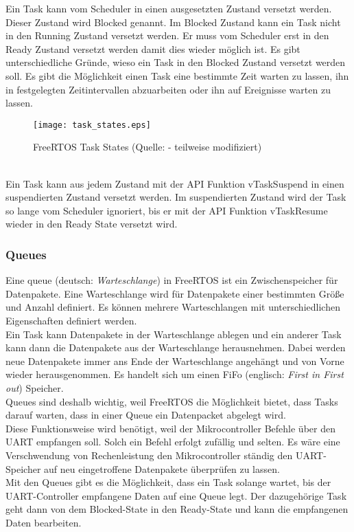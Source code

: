 \noindent
Ein Task kann vom Scheduler in einen ausgesetzten Zustand versetzt werden. Dieser Zustand wird Blocked genannt. Im Blocked Zustand kann ein Task nicht in den Running Zustand versetzt werden. Er muss vom Scheduler erst in den Ready Zustand versetzt werden damit dies wieder möglich ist. Es gibt unterschiedliche Gründe, wieso ein Task in den Blocked Zustand versetzt werden soll. Es gibt die Möglichkeit einen Task eine bestimmte Zeit warten zu lassen, ihn in festgelegten Zeitintervallen abzuarbeiten oder ihn auf Ereignisse warten zu lassen.
\cite[][S. 61]{FRTOSManual}
\begin{figure}[h]
\centering
\texttt{[image: task\_states.eps]}
\caption{FreeRTOS Task States (Quelle: \cite[][S. 67]{FRTOSManual} - teilweise modifiziert)}
\end{figure}
\\
\noindent
Ein Task kann aus jedem Zustand mit der API Funktion vTaskSuspend in einen suspendierten Zustand versetzt werden. Im suspendierten Zustand wird der Task so lange vom Scheduler ignoriert, bis er mit der API Funktion vTaskResume wieder in den Ready State versetzt wird.
\cite[][S. 46]{FRTOSManual}

\subsubsection{Queues}
Eine queue (deutsch: \textit{Warteschlange}) in FreeRTOS ist ein Zwischenspeicher für Datenpakete. Eine Warteschlange wird für Datenpakete einer bestimmten Größe und Anzahl definiert. Es können mehrere Warteschlangen mit unterschiedlichen Eigenschaften definiert werden.\\
Ein Task kann Datenpakete in der Warteschlange ablegen und ein anderer Task kann dann die Datenpakete aus der Warteschlange herausnehmen. Dabei werden neue Datenpakete immer ans Ende der Warteschlange angehängt und von Vorne wieder herausgenommen. Es handelt sich um einen FiFo (englisch: \textit{First in First out}) Speicher.\\
Queues sind deshalb wichtig, weil FreeRTOS die Möglichkeit bietet, dass Tasks darauf warten, dass in einer Queue ein Datenpacket abgelegt wird.\\
Diese Funktionsweise wird benötigt, weil der Mikrocontroller Befehle über den UART empfangen soll. Solch ein Befehl erfolgt zufällig und selten. Es wäre eine Verschwendung von Rechenleistung den Mikrocontroller ständig den UART-Speicher auf neu eingetroffene Datenpakete überprüfen zu lassen.\\
Mit den Queues gibt es die Möglichkeit, dass ein Task solange wartet, bis der UART-Controller empfangene Daten auf eine Queue legt. Der dazugehörige Task geht dann von dem Blocked-State in den Ready-State und kann die empfangenen Daten bearbeiten.
\cite[][S. 103ff]{FRTOSManual}

